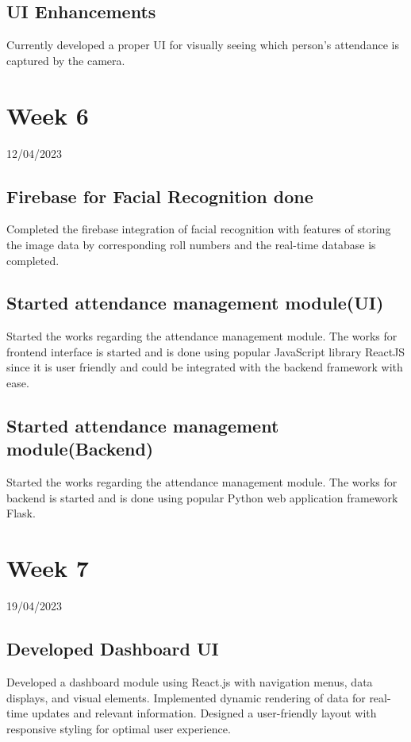 \documentclass[12pt]{book}
\begin{document}
	\section{UI Enhancements}
	Currently developed a proper UI for visually seeing which person's attendance is captured by the camera.
	
	
	\chapter{Week 6}
	\justifying
	\large
	12/04/2023
	
	\paragraph{}
	\section{Firebase for Facial Recognition done}
	Completed the firebase integration of facial recognition with features of storing the image data by corresponding roll numbers and the real-time database is completed.
	\section{Started attendance management module(UI)}
	Started the works regarding the attendance management module. The works for frontend interface is started and is done using popular JavaScript library ReactJS since it is user friendly and could be integrated with the backend framework with ease.
	\section{Started attendance management module(Backend)}
	Started the works regarding the attendance management module. The works for backend is started and is done using popular Python web application framework Flask.
	
	
	\chapter{Week 7}
	\justifying
	\large
	19/04/2023
	
	\paragraph{}
	\section{Developed Dashboard UI}
	Developed a dashboard module using React.js with navigation menus, data displays, and visual elements. Implemented dynamic rendering of data for real-time updates and relevant information. Designed a user-friendly layout with responsive styling for optimal user experience.
\end{document}
